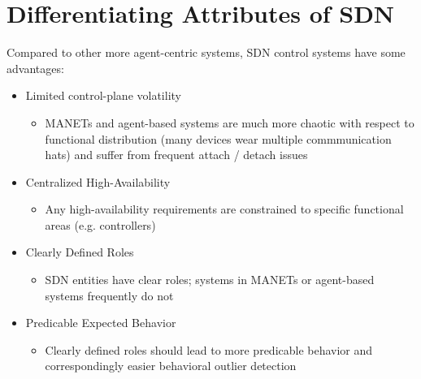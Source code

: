 \documentclass[12pt,letterpaper]{article}
\begin{document}
\section{Differentiating Attributes of SDN}
Compared to other more agent-centric systems, SDN control systems have some advantages:
\begin{itemize}
\item Limited control-plane volatility
	\begin{itemize}
	\item MANETs and agent-based systems are much more chaotic with respect to functional distribution (many devices wear multiple commmunication hats) and suffer from frequent attach / detach issues
	\end{itemize}
\item Centralized High-Availability
	\begin{itemize}
	\item Any high-availability requirements are constrained to specific functional areas (e.g. controllers)
	\end{itemize}
\item Clearly Defined Roles
	\begin{itemize}
	\item SDN entities have clear roles; systems in MANETs or agent-based systems frequently do not
	\end{itemize}
\item Predicable Expected Behavior
	\begin{itemize}
	\item Clearly defined roles should lead to more predicable behavior and correspondingly easier behavioral outlier detection
	\end{itemize}
\end{itemize}
\end{document}
